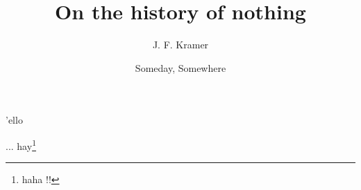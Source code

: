 \documentclass{book}
\title{On the history of nothing}
\author{J. F. Kramer}
\date{Someday, Somewhere}
\begin{document}
\maketitle

'ello

\newpage

\iffootnote
...
\else
hay\footnote{haha \iffootnote !!\fi}
\fi

\end{document}
